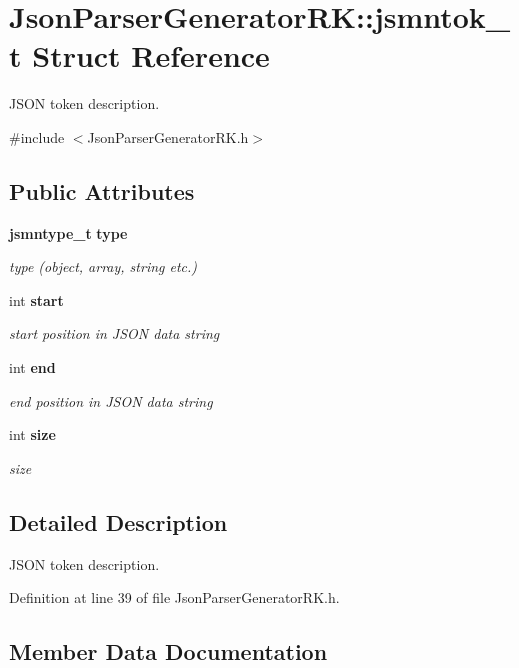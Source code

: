 \section{Json\+Parser\+Generator\+RK\+:\+:jsmntok\+\_\+t Struct Reference}
\label{struct_json_parser_generator_r_k_1_1jsmntok__t}


J\+S\+ON token description.  




{\ttfamily \#include $<$Json\+Parser\+Generator\+R\+K.\+h$>$}

\subsection*{Public Attributes}
\begin{DoxyCompactItemize}
\item 
\textbf{ jsmntype\+\_\+t} \textbf{ type}
\begin{DoxyCompactList}\small\item\em type (object, array, string etc.) \end{DoxyCompactList}\item 
int \textbf{ start}
\begin{DoxyCompactList}\small\item\em start position in J\+S\+ON data string \end{DoxyCompactList}\item 
int \textbf{ end}
\begin{DoxyCompactList}\small\item\em end position in J\+S\+ON data string \end{DoxyCompactList}\item 
int \textbf{ size}
\begin{DoxyCompactList}\small\item\em size \end{DoxyCompactList}\end{DoxyCompactItemize}


\subsection{Detailed Description}
J\+S\+ON token description. 

Definition at line 39 of file Json\+Parser\+Generator\+R\+K.\+h.



\subsection{Member Data Documentation}
\mbox{\label{struct_json_parser_generator_r_k_1_1jsmntok__t_a7bd5d158fd8e6c1be21ab29994ef6bef}} 
